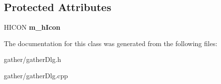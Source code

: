 \subsection*{Protected Attributes}
\begin{DoxyCompactItemize}
\item 
\hypertarget{class_c_gather_dlg_a65d2a8d7ef7163fbe063e90a98438ff7}{H\-I\-C\-O\-N {\bfseries m\-\_\-h\-Icon}}\label{class_c_gather_dlg_a65d2a8d7ef7163fbe063e90a98438ff7}

\end{DoxyCompactItemize}


The documentation for this class was generated from the following files\-:\begin{DoxyCompactItemize}
\item 
gather/gather\-Dlg.\-h\item 
gather/gather\-Dlg.\-cpp\end{DoxyCompactItemize}
